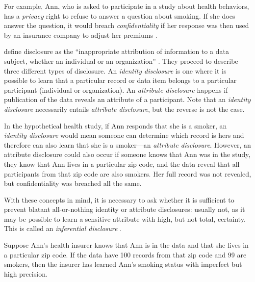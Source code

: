 \begin{bboxfix}
For example, Ann, who is asked to participate in a study about health
behaviors, has a \emph{privacy} right to refuse to answer a question
about smoking. If she does answer the question, it would breach
\emph{confidentiality} if her response was then used by an insurance
company to adjust her premiums \citep{duncan_private_1993}.
\end{bboxfix}

\citet{harris-kojetin_statistical_2005} define disclosure as the ``inappropriate attribution of information to a data subject, whether an individual or an organization'' \citep[p.~4]{harris-kojetin_statistical_2005}. They proceed to describe three different types of disclosure. An \emph{identity disclosure} is one where it is possible to learn that a particular record or data item belongs to a particular participant (individual or organization). An \emph{attribute disclosure} happens if publication of the data reveals an attribute of a participant. Note that an \emph{identity disclosure} necessarily entails \emph{attribute disclosure}, but the reverse is not the case.

\begin{bboxfix}
In the hypothetical health study, if Ann responds that she is a smoker,
an \emph{identity disclosure} would mean someone can determine which
record is hers and therefore can also learn that she is a smoker---an
\emph{attribute disclosure}. However, an attribute disclosure could also
occur if someone knows that Ann was in the study, they know that Ann
lives in a particular zip code, and the data reveal that all
participants from that zip code are also smokers. Her full record was
not revealed, but confidentiality was breached all the same.
\end{bboxfix}

With these concepts in mind, it is necessary to ask whether it is sufficient to prevent blatant all-or-nothing identity or attribute disclosures: usually not, as it may be possible to learn a sensitive attribute with high, but not total, certainty. This is called an \emph{inferential disclosure} \citep{dalenius_towards_1977, duncan_disclosure-limited_1986}.

\begin{bboxfix}
Suppose Ann's health insurer knows that Ann is in the data and that she
lives in a particular zip code. If the data have 100 records from that
zip code and 99 are smokers, then the insurer has learned Ann's smoking
status with imperfect but high precision.
\end{bboxfix}


